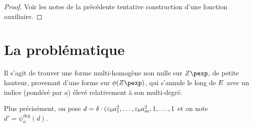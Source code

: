 \begin{proof}
  Voir les notes de la précédente tentative construction d'une fonction
  auxiliaire.
\end{proof}

\section{La problématique}

Il s'agit de trouver une forme multi-homogène non nulle sur $\var$, de petite
hauteur, provenant d'une forme sur $\phi(\var)$, qui s'annule le long de
$E$ avec un indice (pondéré par $a$) élevé relativement à son multi-degré.

Plus précisément, on pose $d = \delta \cdot (\varepsilon_0 a_1^2, \dots, \varepsilon_0
a_m^2, 1, \dots, 1$ et on note $d' = \psi_a^{\deg}(d)$. 


